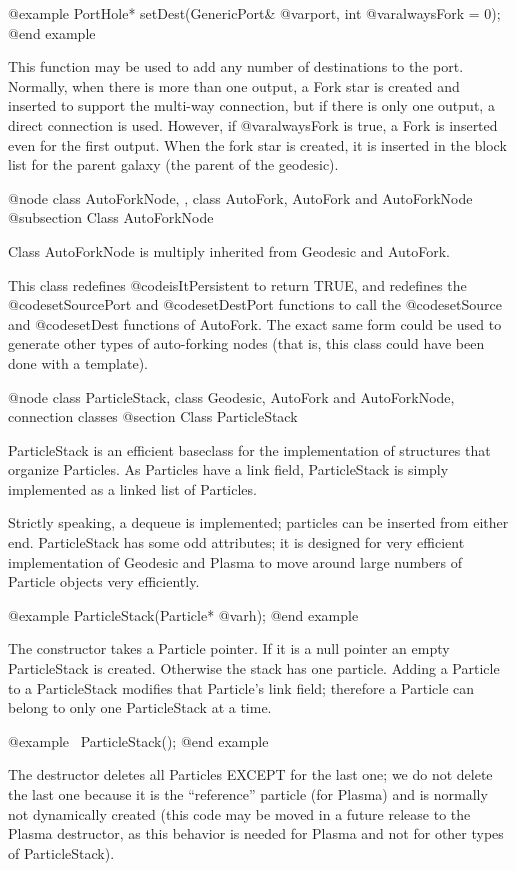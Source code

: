 @example
PortHole* setDest(GenericPort& @var{port}, int @var{alwaysFork} = 0);
@end example

This function may be used to add any number of destinations to the
port.  Normally, when there is more than one output, a Fork star is
created and inserted to support the multi-way connection, but if there
is only one output, a direct connection is used.  However, if
@var{alwaysFork} is true, a Fork is inserted even for the first output.
When the fork star is created, it is inserted in the block list for
the parent galaxy (the parent of the geodesic).

@node class AutoForkNode,  , class AutoFork, AutoFork and AutoForkNode
@subsection Class AutoForkNode

Class AutoForkNode is multiply inherited from Geodesic and AutoFork.

This class redefines @code{isItPersistent} to return TRUE, and redefines
the @code{setSourcePort} and @code{setDestPort} functions to call the
@code{setSource} and @code{setDest} functions of AutoFork.
The exact same form could be used to generate other types of
auto-forking nodes (that is, this class could have been done with
a template).

@node class ParticleStack, class Geodesic, AutoFork and AutoForkNode, connection classes
@section Class ParticleStack

ParticleStack is an efficient baseclass for the implementation of
structures that organize Particles.  As Particles have a link field,
ParticleStack is simply implemented as a linked list of Particles.

Strictly speaking, a dequeue is implemented; particles can be inserted
from either end.  ParticleStack has some odd attributes; it is designed
for very efficient implementation of Geodesic and Plasma to move around
large numbers of Particle objects very efficiently.

@example
ParticleStack(Particle* @var{h});
@end example

The constructor takes a Particle pointer.  If it is a null pointer an
empty ParticleStack is created.  Otherwise the stack has one particle.
Adding a Particle to a ParticleStack modifies that Particle's link
field; therefore a Particle can belong to only one ParticleStack at a
time.

@example
~ParticleStack();
@end example

The destructor deletes all Particles EXCEPT for the last one; we do not
delete the last one because it is the ``reference'' particle (for
Plasma) and is normally not dynamically created (this code may be moved
in a future release to the Plasma destructor, as this behavior is needed
for Plasma and not for other types of ParticleStack).

